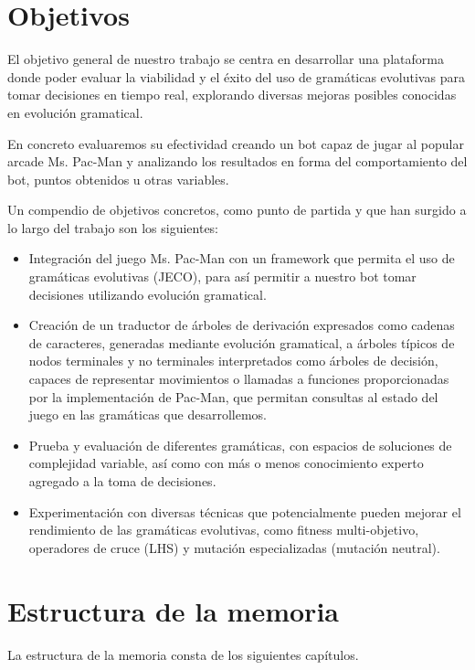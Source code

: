 \section{Objetivos}
El objetivo general de nuestro trabajo se centra en desarrollar una plataforma donde poder evaluar la viabilidad y el éxito del uso de gramáticas evolutivas para tomar decisiones en tiempo real, explorando diversas mejoras posibles conocidas en evolución gramatical. 

En concreto evaluaremos su efectividad creando un bot capaz de jugar al popular arcade Ms. Pac-Man y analizando los resultados en forma del comportamiento del bot, puntos obtenidos u otras variables.
 
Un compendio de objetivos concretos, como punto de partida y que han surgido a lo largo del trabajo son los siguientes:
\begin{itemize}
\item Integración del juego Ms. Pac-Man con un framework que permita el uso de gramáticas evolutivas (JECO), para así permitir a nuestro bot tomar decisiones utilizando evolución gramatical.

\item Creación de un traductor de árboles de derivación expresados como cadenas de caracteres, generadas mediante evolución gramatical, a árboles típicos de nodos terminales y no terminales interpretados como árboles de decisión, capaces de representar movimientos o llamadas a funciones proporcionadas por la implementación de Pac-Man, que permitan consultas al estado del juego en las gramáticas que desarrollemos.

\item Prueba y evaluación de diferentes gramáticas, con espacios de soluciones de complejidad variable, así como con más o menos conocimiento experto agregado a la toma de decisiones.

\item Experimentación con diversas técnicas que potencialmente pueden mejorar el rendimiento de las gramáticas evolutivas, como fitness multi-objetivo, operadores de cruce (LHS) y mutación especializadas (mutación neutral).
\end{itemize}

\section{Estructura de la memoria}
La estructura de la memoria consta de los siguientes capítulos.

